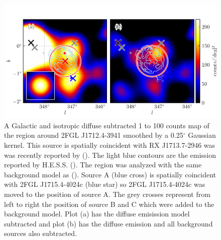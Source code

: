 \documentclass[12pt,preprint]{aastex}
\newcommand{\gev}{\text{GeV}\xspace}
\newcommand{\tev}{\text{TeV}\xspace}
\renewcommand{\deg}{\ensuremath{^\circ}\xspace}
\begin{document}
\begin{figure}
  \begin{center}
    \includegraphics[type=pdf,ext=.pdf,read=.pdf]{source_plots/source_RX_J1713.7-3946}
  \end{center}
  \caption{A Galactic and isotropic diffuse subtracted 1 \gev to 100
  \gev counts map of the region around 2FGL J1712.4-3941 smoothed by a
  0.25\deg Gaussian kernel.  This source is spatially coincident with
  RX J1713.7-2946 was was recently reported by (\cite{rx_j1713_lat}).
  The light blue contours are the \tev emission reported by
  H.E.S.S. (\cite{rx_j1713_hess}).  The region was analyzed with the
  same background model as (\cite{rx_j1713_lat}).  Source A (blue cross)
  is spatially coincident with 2FGL J1715.4-4024c (blue star) so 2FGL
  J1715.4-4024c was moved to the position of source A.  The grey crosses
  represent from left to right the position of source B and C which were
  added to the background model. Plot (a) has the diffuse emisission model
  subtracted and plot (b) has the diffuse emission and all background
  sources also subtracted.
  }\label{2FGL_J1712.4-3941}
\end{figure}
\end{document}
